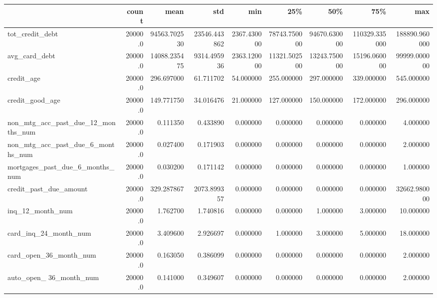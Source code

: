 \begin{tabular}{lrrrrrrrr}
\toprule
{} &    count &          mean &           std &           min &           25\% &           50\% &            75\% &            max \\
\midrule
tot\_credit\_debt                    &  20000.0 &  94563.702530 &  23546.443862 &   2367.430000 &  78743.750000 &  94670.630000 &  110329.335000 &  188890.960000 \\
avg\_card\_debt                      &  20000.0 &  14088.235475 &   9314.495936 &   2363.120000 &  11321.502500 &  13243.750000 &   15196.060000 &   99999.000000 \\
credit\_age                         &  20000.0 &    296.697000 &     61.711702 &     54.000000 &    255.000000 &    297.000000 &     339.000000 &     545.000000 \\
credit\_good\_age                    &  20000.0 &    149.771750 &     34.016476 &     21.000000 &    127.000000 &    150.000000 &     172.000000 &     296.000000 \\
non\_mtg\_acc\_past\_due\_12\_months\_num &  20000.0 &      0.111350 &      0.433890 &      0.000000 &      0.000000 &      0.000000 &       0.000000 &       4.000000 \\
non\_mtg\_acc\_past\_due\_6\_months\_num  &  20000.0 &      0.027400 &      0.171903 &      0.000000 &      0.000000 &      0.000000 &       0.000000 &       2.000000 \\
mortgages\_past\_due\_6\_months\_num    &  20000.0 &      0.030200 &      0.171142 &      0.000000 &      0.000000 &      0.000000 &       0.000000 &       1.000000 \\
credit\_past\_due\_amount             &  20000.0 &    329.287867 &   2073.899357 &      0.000000 &      0.000000 &      0.000000 &       0.000000 &   32662.980000 \\
inq\_12\_month\_num                   &  20000.0 &      1.762700 &      1.740816 &      0.000000 &      0.000000 &      1.000000 &       3.000000 &      10.000000 \\
card\_inq\_24\_month\_num              &  20000.0 &      3.409600 &      2.926697 &      0.000000 &      1.000000 &      3.000000 &       5.000000 &      18.000000 \\
card\_open\_36\_month\_num             &  20000.0 &      0.163050 &      0.386099 &      0.000000 &      0.000000 &      0.000000 &       0.000000 &       2.000000 \\
auto\_open\_ 36\_month\_num            &  20000.0 &      0.141000 &      0.349607 &      0.000000 &      0.000000 &      0.000000 &       0.000000 &       2.000000 \\

\end{tabular}
